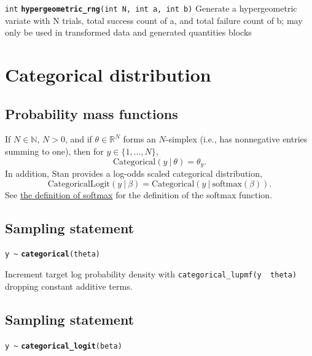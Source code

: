 \documentclass[
  10pt,
]{book}
\begin{document}

\texttt{int} \textbf{\texttt{hypergeometric\_rng}}\texttt{(int\ N,\ int\ a,\ int\ b)}\newline
Generate a hypergeometric variate with N trials, total success count
of a, and total failure count of b; may only be used in transformed data and
generated quantities blocks

\hypertarget{categorical-distribution}{%
\section{Categorical distribution}\label{categorical-distribution}}

\hypertarget{probability-mass-functions}{%
\subsection{Probability mass functions}\label{probability-mass-functions}}

If \(N \in \mathbb{N}\), \(N > 0\), and if \(\theta \in \mathbb{R}^N\) forms
an \(N\)-simplex (i.e., has nonnegative entries summing to one), then
for \(y \in \{1,\ldots,N\}\), \[ \text{Categorical}(y~|~\theta) =
\theta_y. \] In addition, Stan provides a log-odds scaled categorical
distribution, \[ \text{CategoricalLogit}(y~|~\beta) =
\text{Categorical}(y~|~\text{softmax}(\beta)). \]
See \protect\hyperlink{softmax}{the definition of softmax} for the definition of the softmax function.

\hypertarget{sampling-statement-7}{%
\subsection{Sampling statement}\label{sampling-statement-7}}

\texttt{y\ \textasciitilde{}} \textbf{\texttt{categorical}}\texttt{(theta)}

Increment target log probability density with \texttt{categorical\_lupmf(y\ \textbar{}\ theta)}
dropping constant additive terms.

\hypertarget{sampling-statement-8}{%
\subsection{Sampling statement}\label{sampling-statement-8}}

\texttt{y\ \textasciitilde{}} \textbf{\texttt{categorical\_logit}}\texttt{(beta)}
\end{document}
